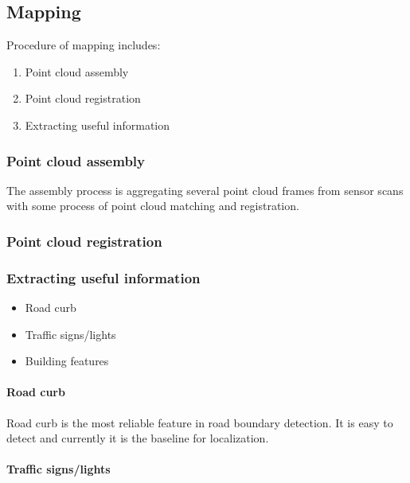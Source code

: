 \documentclass[10 pt,letterpaper,conference]{IEEEtran}
\providecommand{\tightlist}{%
  \setlength{\itemsep}{0pt}\setlength{\parskip}{0pt}}
\begin{document}
\subsection{Mapping}\label{mapping}

Procedure of mapping includes:

\begin{enumerate}
\def\labelenumi{\arabic{enumi}.}
\tightlist
\item
  Point cloud assembly
\item
  Point cloud registration
\item
  Extracting useful information
\end{enumerate}

\subsubsection{Point cloud assembly}\label{point-cloud-assembly}

The assembly process is aggregating several point cloud frames from
sensor scans with some process of point cloud matching and registration.

\subsubsection{Point cloud registration}\label{point-cloud-registration}

\subsubsection{Extracting useful
information}\label{extracting-useful-information}

\begin{itemize}
\tightlist
\item
  Road curb
\item
  Traffic signs/lights
\item
  Building features
\end{itemize}

\paragraph{Road curb}\label{road-curb}

Road curb is the most reliable feature in road boundary detection. It is
easy to detect and currently it is the baseline for localization.

\paragraph{Traffic signs/lights}\label{traffic-signslights}
\end{document}
